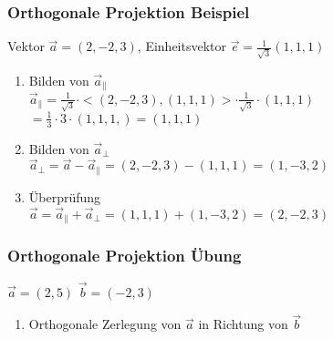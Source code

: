 \begin{frame}
    \frametitle{Orthogonale Projektion Beispiel}
    Vektor $\vec{a} = (2, -2, 3)$, Einheitsvektor $\vec{e} = \frac{1}{\sqrt{3}}(1, 1, 1)$\\

    \begin{enumerate}
        \item Bilden von $\vec{a}_{\parallel}$\\
        $\vec{a}_{\parallel} = \frac{1}{\sqrt{3}} \cdot <(2, -2, 3), (1, 1, 1)> \cdot \frac{1}{\sqrt{3}} \cdot (1, 1, 1)$
        $= \frac{1}{3} \cdot 3 \cdot (1, 1, 1,) = (1, 1, 1)$
        \item Bilden von $\vec{a}_{\perp}$\\
        $\vec{a}_{\perp} = \vec{a} - \vec{a}_{\parallel} = (2, -2, 3) - (1, 1, 1) = (1, -3 , 2)$
        \item Überprüfung\\
        $\vec{a} = \vec{a}_{\parallel} + \vec{a}_{\perp} = (1, 1, 1) + (1, -3, 2) = (2, -2, 3)$
    \end{enumerate}
\end{frame}


\begin{frame}
    \frametitle{Orthogonale Projektion Übung}
    $\vec{a} = (2, 5)$ $\vec{b} = (-2, 3)$\\
    \begin{enumerate}
        \item Orthogonale Zerlegung von $\vec{a}$ in Richtung von $\vec{b}$
    \end{enumerate}
\end{frame}


